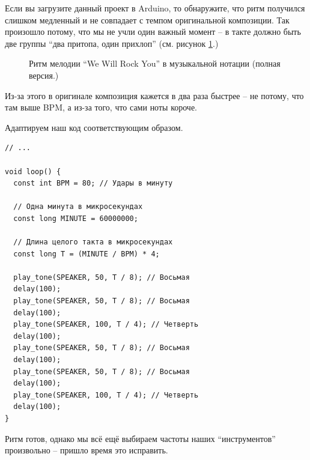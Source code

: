 \documentclass[../sparc.tex]{subfiles}
\begin{document}
Если вы загрузите данный проект в Arduino, то обнаружите, что ритм получился
слишком медленный и не совпадает с темпом оригинальной композиции. Так произошло
потому, что мы не учли один важный момент -- в такте должно быть две группы ``два
притопа, один прихлоп'' (см. рисунок \ref{fig:lilypond-queen-2}.)

\begin{figure}[ht]
  \centering
  \caption{Ритм мелодии ``We Will Rock You'' в музыкальной нотации (полная версия.)}
  \label{fig:lilypond-queen-2}
\end{figure}

Из-за этого в оригинале композиция кажется в два раза быстрее -- не потому, что
там выше BPM, а из-за того, что сами ноты короче.

Адаптируем наш код соответствующим образом.

\begin{verbatim}
// ...

void loop() {
  const int BPM = 80; // Удары в минуту

  // Одна минута в микросекундах
  const long MINUTE = 60000000;

  // Длина целого такта в микросекундах
  const long T = (MINUTE / BPM) * 4;

  play_tone(SPEAKER, 50, T / 8); // Восьмая
  delay(100);
  play_tone(SPEAKER, 50, T / 8); // Восьмая
  delay(100);
  play_tone(SPEAKER, 100, T / 4); // Четверть
  delay(100);
  play_tone(SPEAKER, 50, T / 8); // Восьмая
  delay(100);
  play_tone(SPEAKER, 50, T / 8); // Восьмая
  delay(100);
  play_tone(SPEAKER, 100, T / 4); // Четверть
  delay(100);
}
\end{verbatim}

Ритм готов, однако мы всё ещё выбираем частоты наших ``инструментов''
произвольно -- пришло время это исправить.
\end{document}
